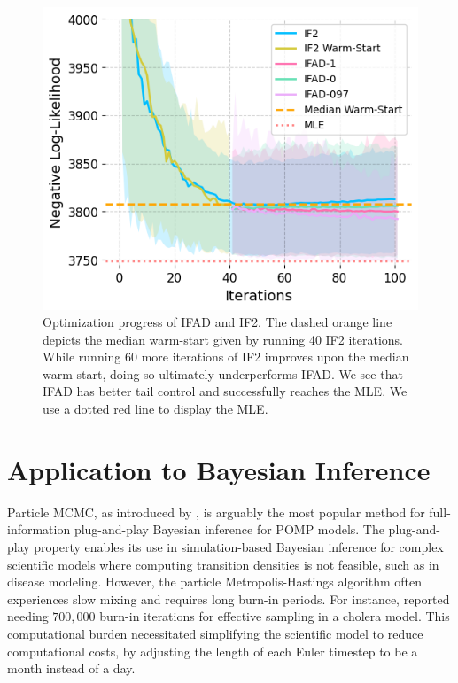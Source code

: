 \documentclass[9pt,twocolumn,pnasresearcharticle]{pnas-new}
\newcommand\arxiv[2]{#2} %
\begin{document}
\begin{figure}[ht]
    \centering
    \includegraphics[width=\arxiv{10cm}{\textwidth/3}]{imgs/095/optim.png}
    \caption{Optimization progress of IFAD and IF2. The dashed orange line depicts the median warm-start given by running 40 IF2 iterations. While running 60 more iterations of IF2 improves upon the median warm-start, doing so ultimately underperforms IFAD. We see that IFAD has better tail control and successfully reaches the MLE. 
    We use a dotted red line to display the MLE.}
    \label{fig:optim}
\end{figure}

\section{Application to Bayesian Inference}
\label{sec:bayes}

Particle MCMC, as introduced by \cite{andrieu10}, is arguably the most popular method for full-information plug-and-play Bayesian inference for POMP models.
The plug-and-play property enables its use in simulation-based Bayesian inference for complex scientific models where computing transition densities is not feasible, such as in disease modeling.
However, the particle Metropolis-Hastings algorithm often experiences slow mixing and requires long burn-in periods.
For instance, \cite{fasiolo16} reported needing $700,000$ burn-in iterations for effective sampling in a cholera model.
This computational burden necessitated simplifying the scientific model to reduce computational costs, by adjusting the length of each Euler timestep to be a month instead of a day. 
\end{document}
